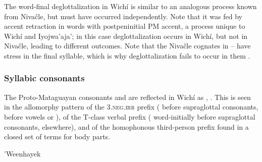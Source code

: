 \begin{exe}
    \ex \mouthits
    \ex \daughterits
    \ex \coalrel
    \ex \arrowkaxe
    \ex \youngersis
    \ex \cavy
\end{exe}

The word-final deglottalization in Wichí is similar to an analogous process known from Nivaĉle, but must have occurred independently. Note that it was fed by accent retraction in words with postpeninitial PM accent, a process unique to Wichí and Iyojwa'aja'; in this case deglottalization occurs in Wichí, but not in Nivaĉle, leading to different outcomes. Note that the Nivaĉle cognates in – have stress in the final syllable, which is why deglottalization fails to occur in them .

\begin{exe}
    \ex \elderbro \label{wini-degl-elderbro}
    \ex \eldersis
    \ex \leg \label{wini-degl-leg}
\end{exe}

\subsubsection{Syllabic consonants}\label{wi-t-n}

The Proto-Mataguayan consonants  and  are reflected in Wichí as , . This is seen in the allomorphy pattern of the 3.\textsc{neg.irr} prefix ( before supraglottal consonants,  before vowels or ), of the T-class verbal prefix ( word-initially before supraglottal consonants,  elsewhere), and of the homophonous third-person prefix found in a closed set of terms for body parts.

\ea\label{ex:syllnt:whk}
'Weenhayek \citep[62, 76, 82, 99, 349, 375--376]{KC16}
    \begin{xlist}
        \ex {}
        \ex {}
        \ex {}
        \ex {}
        \ex {}
        \ex {}
        \ex {}
    \end{xlist}
\z
{}

